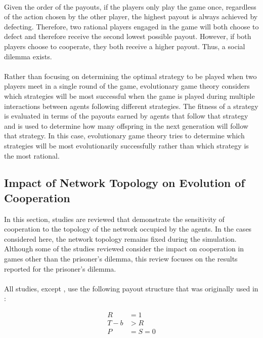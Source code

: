 \documentclass{article}
\begin{document}
    \paragraph{}Given the order of the payouts, if the players only play the game once, regardless of the action chosen by the other player, the highest payout is always achieved by defecting.  Therefore, two rational players engaged in the game will both choose to defect and therefore receive the second lowest possible payout.  However, if both players choose to cooperate, they both receive a higher payout.  Thus, a social dilemma exists.
    \paragraph{}Rather than focusing on determining the optimal strategy to be played when two players meet in a single round of the game, evolutionary game theory considers which strategies will be most successful when the game is played during multiple interactions between agents following different strategies.  The fitness of a strategy is evaluated in terms of the payouts earned by agents that follow that strategy and is used to determine how many offspring in the next generation will follow that strategy.  In this case, evolutionary game theory tries to determine which strategies will be most evolutionarily successfully rather than which strategy is the most rational.

    \subsection{Impact of Network Topology on Evolution of Cooperation} \label{impact-net-topology}
    In this section, studies are reviewed that demonstrate the sensitivity of cooperation to the topology of the network occupied by the agents.  In the cases considered here, the network topology remains fixed during the simulation.  Although some of the studies reviewed consider the impact on cooperation in games other than the prisoner's dilemma, this review focuses on the results reported for the prisoner's dilemma.
    \paragraph{}All studies, except \cite{Santos2006c}, use the following payout structure that was originally used in \cite{Nowak1992}:

    \begin{align}
    	R&=1\\
    	T-b&>R\\
    	P&=S=0
    \end{align}
\end{document}
